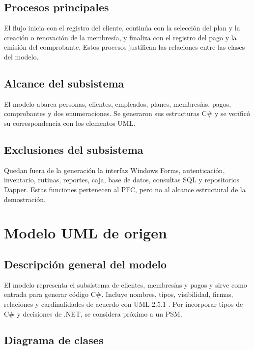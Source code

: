 \documentclass[12pt,a4paper]{article}
\begin{document}
\subsection{Procesos principales}

El flujo inicia con el registro del cliente, continúa con la selección del
plan y la creación o renovación de la membresía, y finaliza con el registro del
pago y la emisión del comprobante. Estos procesos justifican las relaciones
entre las clases del modelo.

\subsection{Alcance del subsistema}

El modelo abarca personas, clientes, empleados, planes, membresías, pagos,
comprobantes y dos enumeraciones. Se generaron sus estructuras C\# y se
verificó su correspondencia con los elementos UML.

\subsection{Exclusiones del subsistema}

Quedan fuera de la generación la interfaz Windows Forms, autenticación,
inventario, rutinas, reportes, caja, base de datos, consultas SQL y repositorios
Dapper. Estas funciones pertenecen al PFC, pero no al alcance estructural de
la demostración.


\section{Modelo UML de origen}

\subsection{Descripción general del modelo}

El modelo representa el subsistema de clientes, membresías y pagos y sirve
como entrada para generar código C\#. Incluye nombres, tipos, visibilidad,
firmas, relaciones y cardinalidades de acuerdo con UML 2.5.1
\cite{omgUML2017}. Por incorporar tipos de C\# y decisiones de .NET, se
considera próximo a un PSM.

\subsection{Diagrama de clases}
\end{document}
